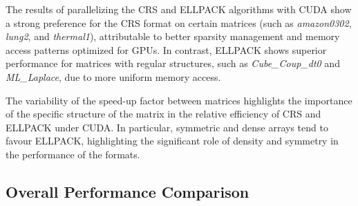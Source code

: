 \documentclass[12pt,oneside]{book} %
\begin{document}
The results of parallelizing the CRS and ELLPACK algorithms with CUDA show a
strong preference for the CRS format on certain matrices (such as
\textit{amazon0302}, \textit{lung2}, and \textit{thermal1}), attributable to
better sparsity management and memory access patterns optimized for GPUs. In
contrast, ELLPACK shows superior performance for matrices with regular
structures, such as \textit{Cube\_Coup\_dt0} and \textit{ML\_Laplace}, due to
more uniform memory access.

The variability of the speed-up factor between matrices highlights the
importance of the specific structure of the matrix in the relative efficiency
of CRS and ELLPACK under CUDA. In particular, symmetric and dense arrays tend
to favour ELLPACK, highlighting the significant role of density and symmetry in
the performance of the formats.

\subsection{Overall Performance Comparison}
\end{document}
